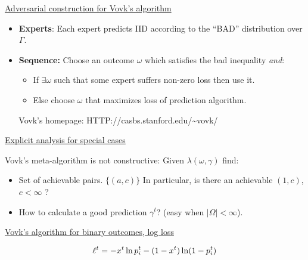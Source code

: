 \begin{flushleft}
\begin{LARGE}
\pagebreak
\begin{center}
\underline{Adversarial construction for Vovk's algorithm}
\end{center}

\begin{itemize}
\item
{\bf Experts}: Each expert predicts IID according to the ``BAD''
distribution over $\Gamma$.
\item
{\bf Sequence:}
Choose an outcome $\omega$ which satisfies the bad inequality {\em
and}:
\begin{itemize}
\item
If $\exists \omega$ such that some expert suffers non-zero loss then use
it.
\item
Else choose $\omega$ that maximizes loss of prediction algorithm.
\end{itemize}
\end{itemize}
~\newline
~\newline
Vovk's homepage: HTTP://casbs.stanford.edu/\~{}vovk/
\pagebreak
\begin{center}
\underline{Explicit analysis for special cases}
\end{center}

Vovk's meta-algorithm is not constructive:\newline
\newline
Given $\lambda(\omega,\gamma)$ find:
\begin{itemize}
\item
Set of achievable pairs. $\{(a,c)\}$ \newline
In particular, is there an achievable $(1,c)$, $c<\infty$ ?
\item
How to calculate a good prediction $\gamma^t$?\newline
(easy when $|\Omega| < \infty$).
\end{itemize}
\pagebreak

\begin{center}
\underline{Vovk's algorithm for binary outcomes, log loss}
\end{center}
\[ \ell_{}^{t} = -x^t \ln p_i^t -(1-x^t) \ln (1-p_i^t) \]


\end{LARGE}
\end{flushleft}
